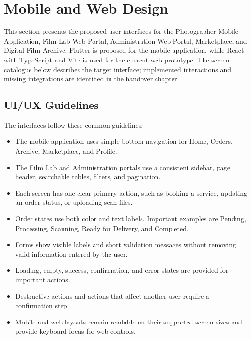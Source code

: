 
\section{Mobile and Web Design}

This section presents the proposed user interfaces for the Photographer Mobile
Application, Film Lab Web Portal, Administration Web Portal, Marketplace, and
Digital Film Archive. Flutter is proposed for the mobile application, while
React with TypeScript and Vite is used for the current web prototype. The screen
catalogue below describes the target interface; implemented interactions and
missing integrations are identified in the handover chapter.

\subsection{UI/UX Guidelines}

The interfaces follow these common guidelines:

\begin{itemize}
    \item The mobile application uses simple bottom navigation for Home,
    Orders, Archive, Marketplace, and Profile.
    \item The Film Lab and Administration portals use a consistent sidebar,
    page header, searchable tables, filters, and pagination.
    \item Each screen has one clear primary action, such as booking a service,
    updating an order status, or uploading scan files.
    \item Order states use both color and text labels. Important examples are
    Pending, Processing, Scanning, Ready for Delivery, and Completed.
    \item Forms show visible labels and short validation messages without
    removing valid information entered by the user.
    \item Loading, empty, success, confirmation, and error states are provided
    for important actions.
    \item Destructive actions and actions that affect another user require a
    confirmation step.
    \item Mobile and web layouts remain readable on their supported screen
    sizes and provide keyboard focus for web controls.
\end{itemize}

